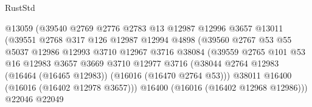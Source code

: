 \begin{lexlean}{RustStd}
\begin{coremodule}
                                      @13059
                                      (@39540
                                        @2769
                                        @2776
                                        @2783
                                        @13
                                        @12987
                                        @12996
                                        @3657
                                        @13011
                                        (@39551
                                          @2768
                                          @317
                                          @126
                                          @12987
                                          @12994
                                          @4898
                                          (@39560
                                            @2767
                                            @53
                                            @55
                                            @5037
                                            @12986
                                            @12993
                                            @3710
                                            @12967
                                            @3716
                                            @38084
                                            (@39559
                                              @2765
                                              @101
                                              @53
                                              @16
                                              @12983
                                              @3657
                                              @3669
                                              @3710
                                              @12977
                                              @3716
                                              (@38044
                                                @2764
                                                @12983
                                                (@16464 (@16465 @12983))
                                                (@16016 (@16470 @2764 @53)))
                                              @38011
                                              @16400
                                              (@16016 (@16402 @12978 @3657)))
                                            @16400
                                            (@16016 (@16402 @12968 @12986)))
                                          @22046
                                          @22049

\end{coremodule}
\end{lexlean}
